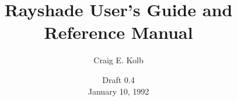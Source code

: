 %
%
%
\newenvironment{defkey}[2]{\begin{description} \item[] {\tt #1\/} #2 \\}{\end{description}}
\newenvironment{defprim}[2]{\begin{description} \item[] {\tt #1\/} #2 \\}{\end{description}}
\newcommand{\evec}[1]{$\overrightarrow{\em {#1}}$}
\newenvironment{example}{\begin{verbatim}}{\end{verbatim}}


\newcommand{\Rayshade}{\mbox{{\em Rayshade}\/}}
\newcommand{\rayshade}{\mbox{{\em rayshade}\/}}

\title{Rayshade User's Guide and Reference Manual}
\author{Craig E. Kolb}
\date{Draft 0.4 \\
January 10, 1992}

\maketitle
{}

\tableofcontents
\parskip=0.1in









\appendix




